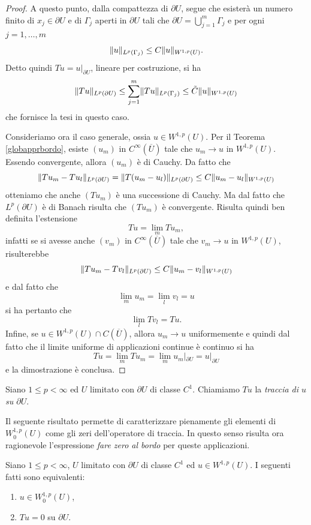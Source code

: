 \begin{proof}
	A questo punto, dalla compattezza di $\partial U$, segue che esisterà un numero finito di $x_j \in \partial U$ e di $\Gamma_j$ aperti in $\partial U$ tali che $\partial U = \bigcup_{j=1}^{m}\Gamma_j$ e per ogni $j=1,\dots,m$
	\[\lVert u\rVert_{L^p(\Gamma_j)} \le C\lVert u\rVert_{W^{1,p}(U)}. \]
	Detto quindi $Tu = u|_{\partial U}$, lineare per costruzione, si ha 
	\[ \lVert Tu\rVert_{L^p(\partial U)} \le \sum_{j=1}^{m} \lVert Tu\rVert_{L^p(\Gamma_j)} \le \tilde{C} \lVert u\rVert_{W^{1,p}(U)} \]
	che fornisce la tesi in questo caso.
	
	Consideriamo ora il caso generale, ossia $u \in W^{1,p}(U)$. Per il Teorema \eqref{globapprbordo}, esiste $(u_m)$ in $C^\infty(\overline{U})$ tale che $u_m \to u$ in $W^{1,p}(U)$. Essendo convergente, allora $(u_m)$ è di Cauchy. Da fatto che 
	\[ \lVert Tu_m- Tu_l\rVert_{L^{p}(\partial U)} = \lVert T(u_m- u_l)\rVert_{L^{p}(\partial U)} \le C \lVert u_m - u_l\rVert_{W^{1,p}(U)} \]
	otteniamo che  anche $(Tu_m)$ è una successione di Cauchy. Ma dal fatto che $L^{p}(\partial U)$ è di Banach risulta che $(Tu_m)$ è convergente. Risulta quindi ben definita l'estensione
	\[ Tu = \lim\limits_{m} Tu_m, \]
	infatti se si avesse anche $(v_m)$ in $C^\infty(\overline{U})$ tale che $v_m \to u$ in $W^{1,p}(U)$, risulterebbe
	\[ \lVert Tu_m- Tv_l\rVert_{L^{p}(\partial U)} \le C \lVert u_m - v_l\rVert_{W^{1,p}(U)} \]
	e dal fatto che 
	\[ \lim\limits_{m} u_m  = \lim\limits_{l} v_l = u\]
	si ha pertanto che 
	\[ \lim\limits_{l} Tv_l = Tu. \]
	Infine, se $u \in W^{1,p}(U)\cap C(\overline{U})$, allora $u_m \to u$ uniformemente e quindi dal fatto che il limite uniforme di applicazioni continue è continuo si ha
	\[ Tu = \lim_{m} Tu_m = \lim_{m} u_m|_{\partial U} = u|_{\partial U}\]
	e la dimostrazione è conclusa.
\end{proof}
\begin{definizione}
	Siano $1 \le p <\infty$ ed $U$ limitato con $\partial U$ di classe $C^1$. Chiamiamo $Tu$ la \emph{traccia di $u$ su $\partial U$}.
\end{definizione}
Il seguente risultato permette di caratterizzare pienamente gli elementi di $W^{1,p}_0(U)$ come gli zeri dell'operatore di traccia. In questo senso risulta ora ragionevole l'espressione \emph{fare zero al bordo} per queste applicazioni.
\begin{teorema}
	Siano $1 \le p <\infty$, $U$ limitato con $\partial U$ di classe $C^1$ ed $u \in W^{1,p}(U)$. I seguenti fatti sono equivalenti:
	\begin{enumerate}[$(a)$]
		\item $u \in  W^{1,p}_0(U)$,
		\item $Tu = 0$ su $\partial U$.
	\end{enumerate}
\end{teorema}
